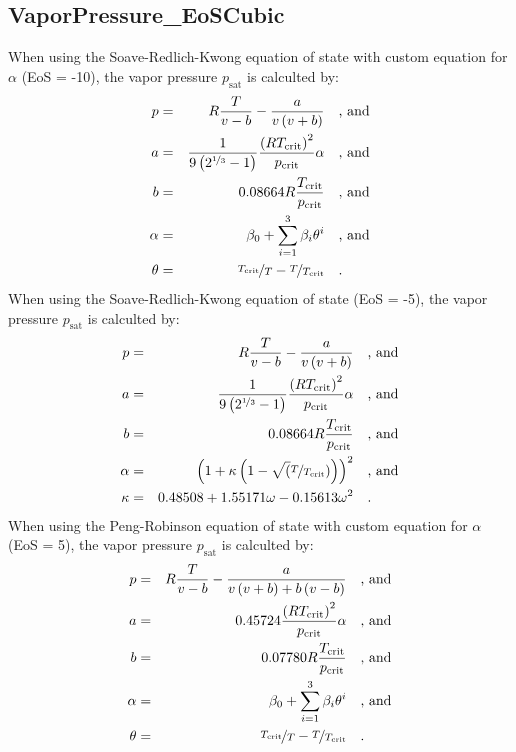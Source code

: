 \subsection{VaporPressure\_EoSCubic}
\label{cha:approaches:refp:eoscubic}
%
When using the Soave-Redlich-Kwong equation of state with custom equation for $\alpha$ (EoS = -10), the vapor pressure $p_\mathrm{sat}$ is calculted by:
%
\begin{equation*}
	\begin{split}
		p &=& R \frac{T}{v - b} - \frac{a}{v \left(v + b\right)} & \quad\text{, and} \\
		a &=& \frac{1}{9 \left(2^{\nicefrac{1}{3}} - 1\right)} \frac{\left(R T_\mathrm{crit} \right)^2}{p_\mathrm{crit}} \alpha & \quad\text{, and} \\
		b &=& 0.08664 R \frac{T_\mathrm{crit}}{p_\mathrm{crit}} & \quad\text{, and} \\
		\alpha &=& \beta_{0} + \sum_{i=1}^{3} \beta_{i} \theta^i & \quad\text{, and} \\
		\theta &=& \nicefrac{T_{\mathrm{crit}}}{T} - \nicefrac{T}{T_{\mathrm{crit}}} & \quad\text{.}
	\end{split}
\end{equation*}
%
When using the Soave-Redlich-Kwong equation of state (EoS = -5), the vapor pressure $p_\mathrm{sat}$ is calculted by:
%
\begin{equation*}
	\begin{split}
		p &=& R \frac{T}{v - b} - \frac{a}{v \left(v + b\right)} & \quad\text{, and} \\
		a &=& \frac{1}{9 \left(2^{\nicefrac{1}{3}} - 1\right)} \frac{\left(R T_\mathrm{crit} \right)^2}{p_\mathrm{crit}} \alpha & \quad\text{, and} \\
		b &=& 0.08664 R \frac{T_\mathrm{crit}}{p_\mathrm{crit}} & \quad\text{, and} \\
		\alpha &=& \left(1 + \kappa \left(1 - \sqrt(\nicefrac{T}{T_\mathrm{crit}}) \right) \right)^2 & \quad\text{, and} \\
		\kappa &=& 0.48508 + 1.55171 \omega - 0.15613 \omega^2 & \quad\text{.}
	\end{split}
\end{equation*}
%
When using the Peng-Robinson equation of state with custom equation for  $\alpha$ (EoS = 5), the vapor pressure $p_\mathrm{sat}$ is calculted by:
%
\begin{equation*}
\begin{split}
	p &=& R \frac{T}{v - b} - \frac{a}{v \left(v + b\right) + b \left(v - b\right)} & \quad\text{, and} \\
	a &=& 0.45724 \frac{\left(R T_\mathrm{crit} \right)^2}{p_\mathrm{crit}} \alpha & \quad\text{, and} \\
	b &=& 0.07780 R \frac{T_\mathrm{crit}}{p_\mathrm{crit}} & \quad\text{, and} \\
	\alpha &=& \beta_{0} + \sum_{i=1}^{3} \beta_{i} \theta^i & \quad\text{, and} \\
	\theta &=& \nicefrac{T_{\mathrm{crit}}}{T} - \nicefrac{T}{T_{\mathrm{crit}}} & \quad\text{.}
\end{split}
\end{equation*}
